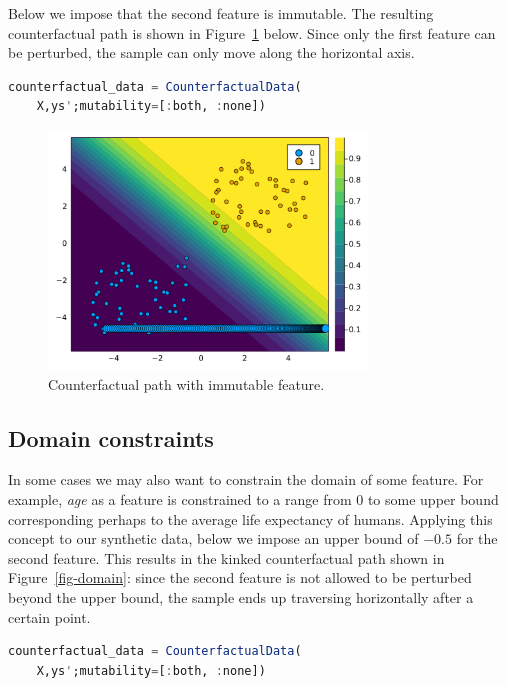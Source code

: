 \documentclass{juliacon}
\begin{document}
Below we impose that the second feature is immutable. The resulting
counterfactual path is shown in Figure~\ref{fig-mutability} below. Since
only the first feature can be perturbed, the sample can only move along
the horizontal axis.

\begin{lstlisting}[language=Julia, escapechar=@]
counterfactual_data = CounterfactualData(
    X,ys';mutability=[:both, :none])
\end{lstlisting}

\begin{figure}

{\centering \includegraphics[width=3.33333in,height=2.5in]{www/constraint_mutability.png}

}

\caption{\label{fig-mutability}Counterfactual path with immutable
feature.}

\end{figure}

\hypertarget{domain-constraints}{%
\subsection{Domain constraints}\label{domain-constraints}}

In some cases we may also want to constrain the domain of some feature.
For example, \emph{age} as a feature is constrained to a range from 0 to
some upper bound corresponding perhaps to the average life expectancy of
humans. Applying this concept to our synthetic data, below we impose an
upper bound of \(-0.5\) for the second feature. This results in the
kinked counterfactual path shown in Figure~\ref{fig-domain}: since the
second feature is not allowed to be perturbed beyond the upper bound,
the sample ends up traversing horizontally after a certain point.

\begin{lstlisting}[language=Julia, escapechar=@]
counterfactual_data = CounterfactualData(
    X,ys';mutability=[:both, :none])
\end{lstlisting}
\end{document}
